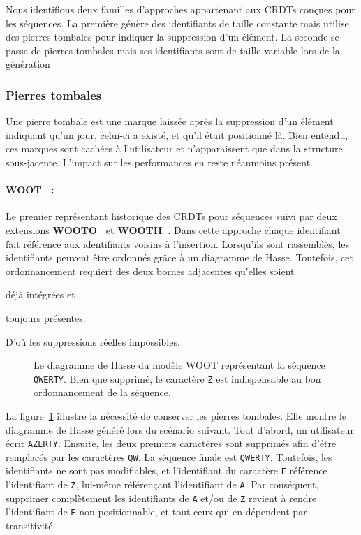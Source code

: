 Nous identifions deux familles d'approches appartenant aux CRDTs conçues pour
les séquences. La première génère des identifiants de taille constante mais
utilise des pierres tombales pour indiquer la suppression d'un élément. La
seconde se passe de pierres tombales mais ses identifiants sont de taille
variable lors de la génération

\subsubsection{Pierres tombales}

Une pierre tombale est une marque laissée après la suppression d'un élément
indiquant qu'un jour, celui-ci a existé, et qu'il était positionné là. Bien
entendu, ces marques sont cachées à l'utilisateur et n'apparaissent que dans la
structure sous-jacente. L'impact sur les performances en reste néanmoins
présent.

\paragraph{WOOT~\cite{oster2006data} :} Le premier représentant historique des
CRDTs pour séquences suivi par deux extensions
\textbf{WOOTO~\cite{weiss2007wooki}} et
\textbf{WOOTH~\cite{ahmed2011evaluating}}. Dans cette approche chaque
identifiant fait référence aux identifiants voisins à l'insertion.  Lorsqu'ils
sont rassemblés, les identifiants peuvent être ordonnés grâce à un diagramme de
Hasse. Toutefois, cet ordonnancement requiert des deux bornes adjacentes
qu'elles soient
\begin{inparaenum}[(i)]
\item déjà intégrées et
\item toujours présentes.
\end{inparaenum}
D'où les suppressions réelles impossibles.

\begin{figure}
  \centering
  
  \caption[Diagramme de Hasse dans WOOT]
  {\label{repl:fig:wootexample}Le diagramme de Hasse du modèle WOOT représentant
    la séquence \texttt{QWERTY}. Bien que supprimé, le caractère \texttt{Z} est
    indispensable au bon ordonnancement de la séquence.}
\end{figure}

\noindent La figure~\ref{repl:fig:wootexample} illustre la nécessité de
conserver les pierres tombales. Elle montre le diagramme de Hasse généré lors du
scénario suivant. Tout d'abord, un utilisateur écrit \texttt{AZERTY}. Ensuite,
les deux premiers caractères sont supprimés afin d'être remplacés par les
caractères \texttt{QW}. La séquence finale est \texttt{QWERTY}. Toutefois, les
identifiants ne sont pas modifiables, et l'identifiant du caractère \texttt{E}
référence l'identifiant de \texttt{Z}, lui-même référençant l'identifiant de
\texttt{A}. Par conséquent, supprimer complètement les identifiants de
\texttt{A} et/ou de \texttt{Z} revient à rendre l'identifiant de \texttt{E} non
positionnable, et tout ceux qui en dépendent par transitivité.

